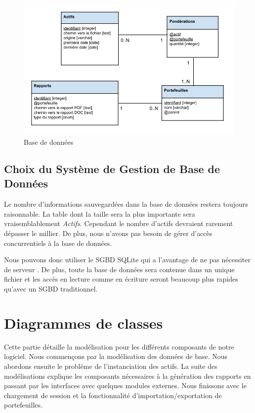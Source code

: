 \documentclass[a4paper,titlepage,french]{report}
\begin{document}
\begin{figure}
  	\center
  	\includegraphics[width=1\textwidth]{base-donnees.png}
  	\caption{Base de données}
  	\label{fig:base-donnees}
\end{figure}


\subsection{Choix du Système de Gestion de Base de Données}

Le nombre d'informations sauvegardées dans la base de données restera toujours raisonnable.
La table dont la taille sera la plus importante sera vraisemblablement \textit{Actifs}.
Cependant le nombre d'actifs devraient rarement dépasser le millier.
De plus, nous n'avons pas besoin de gérer d'accès concurrentiels à la base de données.

Nous pouvons donc utiliser le SGBD SQLite qui a l'avantage de ne pas nécessiter de serveur \cite{website:SQLite}.
De plus, toute la base de données sera contenue dans un unique fichier et les accès en lecture comme en écriture seront beaucoup plus rapides qu'avec un SGBD traditionnel.


\section{Diagrammes de classes}

Cette partie détaille la modélisation pour les différents composants de notre logiciel.
Nous commençons par la modélisation des données de base. Nous abordons ensuite le problème de l'instanciation des actifs.
La suite des modélisations explique les composants nécessaires à la génération des rapports en passant par les interfaces avec quelques modules externes.
Nous finissons avec le chargement de session et la fonctionnalité d'importation/exportation de portefeuilles.
\end{document}
